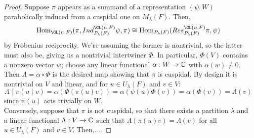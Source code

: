 \begin{proof}
	Suppose $\pi$ appears as a summand of a representation $(\psi,W)$ parabolically induced from a cuspidal one on $M_\lambda(F)$. Then,
	\[ \Hom_{\GL(n,F)}(\pi,Ind_{P_\lambda(F)}^{\GL(n,F)}\psi,\pi) \cong \Hom_{P_\lambda(F)}(Res_{P_\lambda(F)}^{\GL(n,F)}\pi,\psi) \]
	by Frobenius reciprocity. We're assuming the former is nontrivial, so the latter must also be, giving us a nontrivial intertwiner $\Phi$. In particular, $\Phi(V)$ contains a nonzero vector $w$; choose any linear functional $\alpha : W \to \mathbb{C}$ with $\alpha(w) \neq 0$. Then $\Lambda = \alpha \circ \Phi$ is the desired map showing that $\pi$ is cuspidal. By design it is nontrivial on $V$ and linear, and for $u \in U_\lambda(F)$ and $v \in V$:
	\[ \Lambda(\pi(u)v) = \alpha(\Phi(\pi(u)v)) = \alpha(\psi(u)\Phi(v)) = \alpha(\Phi(v)) = \Lambda(v) \]
	since $\psi(u)$ acts trivially on $W$. \\
	
	Conversely, suppose that $\pi$ is not cuspidal, so that there exists a partition $\lambda$ and a linear functional $\Lambda : V \to \mathbb{C}$ such that $\Lambda(\pi(u)v) = \Lambda(v)$ for all $u \in U_\lambda(F)$ and $v \in V$. Then,....
\end{proof}
